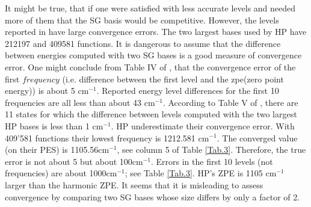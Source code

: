  It might be true, that if one  were satisfied with less accurate levels and needed  more of them that the SG basis would be competitive.   However, the 
levels reported in   have large convergence errors.  
%
The two largest bases used by HP have 212197  and 409581 functions.   It is dangerous to assume that the difference between energies computed with two SG bases  is a good
measure of convergence error.     \cite{Halverson2012,Halverson2014,Halverson2015}  
One might conclude from    Table  IV  of ,  that  the convergence error  of  the   first $ frequency$   (i.e. difference between the first level and the zpe(zero point energy)) is about 
5  cm$^{-1}$.   Reported energy level differences   for the first 10 frequencies  are all less than about 43  cm$^{-1}$.   
According to Table  V  of , there are 11 states for which the difference between levels computed with the two  largest HP bases is less than 1  
cm$^{-1}$.   
%
HP underestimate their convergence error.   With  409'581 
functions their  lowest frequency is 
1212.581  cm$^{-1}$.  
%
     The converged value (on their PES) is  1105.56cm$^{-1}$, see column 5 of Table   \ref{Tab.3}.       Therefore, the true  error is not   about   5 but  about 100cm$^{-1}$.
Errors in the first 10 levels (not frequencies) are about 
 1000cm$^{-1}$; see Table \ref{Tab.3}.  
HP's ZPE is   1105  cm$^{-1}$ larger than the harmonic ZPE.
It seems that it is misleading to assess convergence by comparing two SG bases whose size differs by only a factor of 2.  

 


